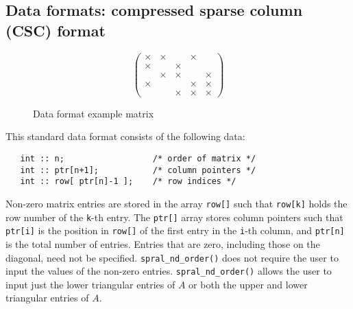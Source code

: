 


\subsection{Data formats: compressed sparse column (CSC) format} \label{nd:cscformat} \label{nd:dataformats}

\begin{figure}
   \caption{ \label{nd:format eg}
      Data format example matrix
   }
   $$
      \left( \begin{array}{ccccc}
         \times & \times &     & \times &     \\
         \times &     & \times &     &     \\
             & \times & \times &     & \times \\
         \times &     &     & \times & \times \\
             &     & \times & \times & \times
      \end{array} \right)
   $$
\end{figure}

This standard data format consists of the following data:
\begin{verbatim}
   int :: n;                  /* order of matrix */
   int :: ptr[n+1];           /* column pointers */
   int :: row[ ptr[n]-1 ];    /* row indices */
\end{verbatim}
Non-zero matrix entries are  stored in
the array \texttt{row[]}  such that \texttt{row[k]} holds
the row number of the \texttt{k}-th entry.
The \texttt{ptr[]} array stores column pointers such that \texttt{ptr[i]} is
the position in \texttt{row[]}  of
the first entry in the \texttt{i}-th column, and \texttt{ptr[n]} is
the total number of entries.
Entries that are zero, including those on the diagonal, need not be specified. 
\texttt{spral\_nd\_order()} does not require the user to 
input the values of the non-zero entries.
\texttt{spral\_nd\_order()} allows the user to input just the lower triangular 
entries of $A$  or both the upper and lower triangular entries of $A.$

